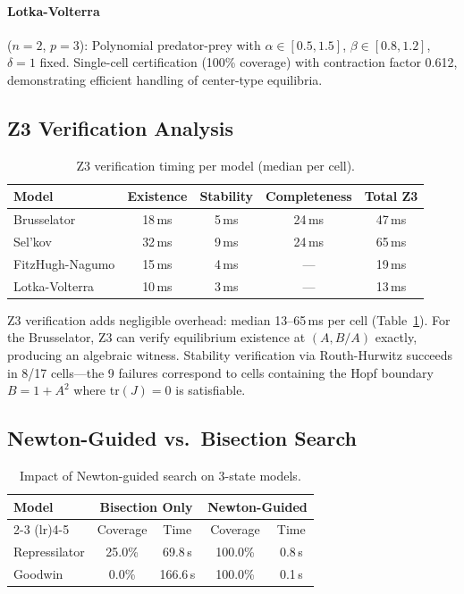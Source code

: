 \documentclass[11pt]{article}
\begin{document}
\paragraph{Lotka-Volterra} ($n{=}2$, $p{=}3$): Polynomial predator-prey with $\alpha \in [0.5, 1.5]$, $\beta \in [0.8, 1.2]$, $\delta{=}1$ fixed.
Single-cell certification (100\% coverage) with contraction factor 0.612, demonstrating efficient handling of center-type equilibria.

\subsection{Z3 Verification Analysis}

\begin{table}[t]
\centering
\caption{Z3 verification timing per model (median per cell).}
\label{tab:z3-timing}
\small
\begin{tabular}{@{}lcccc@{}}
\toprule
Model & Existence & Stability & Completeness & Total Z3 \\
\midrule
Brusselator & 18\,ms & 5\,ms & 24\,ms & 47\,ms \\
Sel'kov & 32\,ms & 9\,ms & 24\,ms & 65\,ms \\
FitzHugh-Nagumo & 15\,ms & 4\,ms & --- & 19\,ms \\
Lotka-Volterra & 10\,ms & 3\,ms & --- & 13\,ms \\
\bottomrule
\end{tabular}
\end{table}

Z3 verification adds negligible overhead: median 13--65\,ms per cell (Table~\ref{tab:z3-timing}).
For the Brusselator, Z3 can verify equilibrium existence at $(A, B/A)$ exactly, producing an algebraic witness.
Stability verification via Routh-Hurwitz succeeds in 8/17 cells---the 9 failures correspond to cells containing the Hopf boundary $B = 1 + A^2$ where tr$(J) = 0$ is satisfiable.

\subsection{Newton-Guided vs.\ Bisection Search}

\begin{table}[t]
\centering
\caption{Impact of Newton-guided search on 3-state models.}
\label{tab:newton}
\small
\begin{tabular}{@{}lcccc@{}}
\toprule
Model & \multicolumn{2}{c}{Bisection Only} & \multicolumn{2}{c}{Newton-Guided} \\
\cmidrule(lr){2-3} \cmidrule(lr){4-5}
 & Coverage & Time & Coverage & Time \\
\midrule
Repressilator & 25.0\% & 69.8\,s & 100.0\% & 0.8\,s \\
Goodwin       & 0.0\%  & 166.6\,s & 100.0\% & 0.1\,s \\
\bottomrule
\end{tabular}
\end{table}
\end{document}
